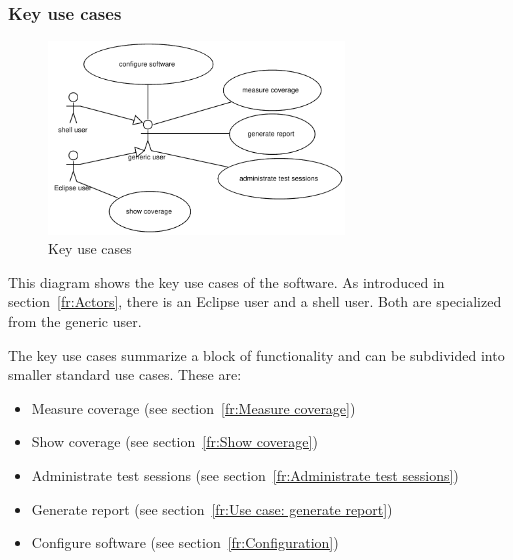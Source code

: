 \clearpage
\subsubsection{Key use cases} \label{fr:Key use cases}
\begin{figure}[htp]
 \centering
 \includegraphics[width=0.7\textwidth]{images/Use_Case_Models/keyusecases}
 \caption{Key use cases}
 \label{fr_fg:Key use cases}
\end{figure}
This diagram shows the key use cases of the software. As introduced in section~\ref{fr:Actors}, there is an Eclipse user and a shell user. Both are specialized from the generic user.
\par
The key use cases summarize a block of functionality and can be subdivided into smaller standard use cases. These are:
\begin{itemize}
  \item Measure coverage (see section~\ref{fr:Measure coverage})
  \item Show coverage (see section~\ref{fr:Show coverage})
  \item Administrate test sessions (see section~\ref{fr:Administrate test sessions})
  \item Generate report (see section~\ref{fr:Use case: generate report})
  \item Configure software (see section~\ref{fr:Configuration})
\end{itemize}

\clearpage
